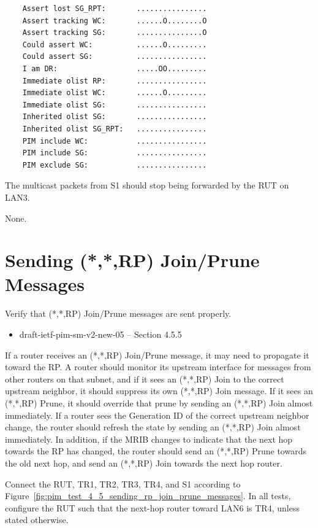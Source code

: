 \documentclass[11pt]{report}
\begin{document}
\begin{itemize}
\begin{verbatim}
    Assert lost SG_RPT:       ................
    Assert tracking WC:       ......O........O
    Assert tracking SG:       ...............O
    Could assert WC:          ......O.........
    Could assert SG:          ................
    I am DR:                  .....OO.........
    Immediate olist RP:       ................
    Immediate olist WC:       ......O.........
    Immediate olist SG:       ................
    Inherited olist SG:       ................
    Inherited olist SG_RPT:   ................
    PIM include WC:           ................
    PIM include SG:           ................
    PIM exclude SG:           ................
\end{verbatim}

  The multicast packets from S1 should stop being forwarded by the RUT on
  LAN3.

\end{itemize}

None.

\newpage
\section{Sending (*,*,RP) Join/Prune Messages}

Verify that (*,*,RP) Join/Prune messages are sent properly.

\begin{itemize}
  \item draft-ietf-pim-sm-v2-new-05 -- Section 4.5.5
\end{itemize}

If a router receives an (*,*,RP) Join/Prune message, it may need to propagate
it toward the RP. A router should monitor its upstream interface for messages
from other routers on that subnet, and if it sees an (*,*,RP) Join to the
correct upstream neighbor, it should suppress its own (*,*,RP) Join message.
If it sees an (*,*,RP) Prune, it should override that prune by sending an
(*,*,RP) Join almost immediately. If a router sees the Generation ID of the
correct upstream neighbor change, the router should refresh the state by
sending an (*,*,RP) Join almost immediately. In addition, if the MRIB changes
to indicate that the next hop towards the RP has changed, the router should
send an (*,*,RP) Prune towards the old next hop, and send an (*,*,RP) Join
towards the next hop router.

Connect the RUT, TR1, TR2, TR3, TR4, and S1 according to
Figure~\ref{fig:pim_test_4_5_sending_rp_join_prune_messages}.
In all tests, configure the RUT such that the next-hop router toward LAN6 is
TR4, unless stated otherwise.
\end{document}
